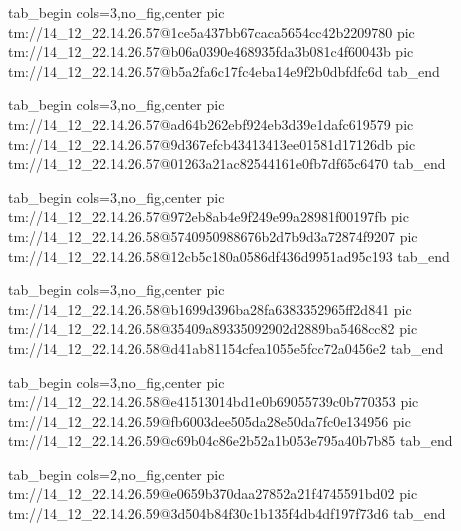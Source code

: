  
 
 
 
 

\qqSecCmtScr


\ifcmt
  tab_begin cols=3,no_fig,center
    pic tm://14_12_22.14.26.57@1ce5a437bb67caca5654cc42b2209780
    pic tm://14_12_22.14.26.57@b06a0390e468935fda3b081c4f60043b
    pic tm://14_12_22.14.26.57@b5a2fa6c17fc4eba14e9f2b0dbfdfc6d
  tab_end
\fi


\ifcmt
  tab_begin cols=3,no_fig,center
    pic tm://14_12_22.14.26.57@ad64b262ebf924eb3d39e1dafc619579
    pic tm://14_12_22.14.26.57@9d367efcb43413413ee01581d17126db
    pic tm://14_12_22.14.26.57@01263a21ac82544161e0fb7df65c6470
  tab_end
\fi


\ifcmt
  tab_begin cols=3,no_fig,center
    pic tm://14_12_22.14.26.57@972eb8ab4e9f249e99a28981f00197fb
    pic tm://14_12_22.14.26.58@5740950988676b2d7b9d3a72874f9207
    pic tm://14_12_22.14.26.58@12cb5c180a0586df436d9951ad95c193
  tab_end
\fi


\ifcmt
  tab_begin cols=3,no_fig,center
    pic tm://14_12_22.14.26.58@b1699d396ba28fa6383352965ff2d841
    pic tm://14_12_22.14.26.58@35409a89335092902d2889ba5468cc82
    pic tm://14_12_22.14.26.58@d41ab81154cfea1055e5fcc72a0456e2
  tab_end
\fi


\ifcmt
  tab_begin cols=3,no_fig,center
    pic tm://14_12_22.14.26.58@e41513014bd1e0b69055739c0b770353
    pic tm://14_12_22.14.26.59@fb6003dee505da28e50da7fc0e134956
    pic tm://14_12_22.14.26.59@c69b04c86e2b52a1b053e795a40b7b85
  tab_end
\fi


\ifcmt
  tab_begin cols=2,no_fig,center
    pic tm://14_12_22.14.26.59@e0659b370daa27852a21f4745591bd02
    pic tm://14_12_22.14.26.59@3d504b84f30c1b135f4db4df197f73d6
  tab_end
\fi

